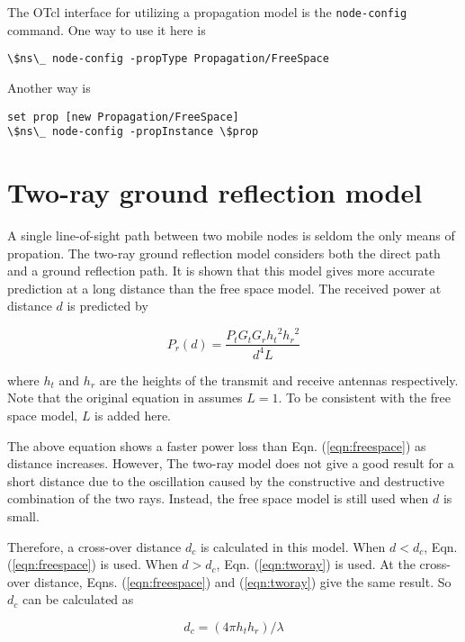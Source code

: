 The OTcl interface for utilizing a propagation model is the {\tt node-config}
command. One way to use it here is

\begin{verbatim}
\$ns\_ node-config -propType Propagation/FreeSpace
\end{verbatim}

Another way is

\begin{verbatim}
set prop [new Propagation/FreeSpace]
\$ns\_ node-config -propInstance \$prop
\end{verbatim}

\section{Two-ray ground reflection model}
\label{sec:tworay}

A single line-of-sight path between two mobile nodes is seldom the only means
of propation. The two-ray ground reflection model considers both the direct
path and a ground reflection path. It is shown \cite{Rappaport96} that this
model gives more accurate prediction at a long distance than the free space
model. The received power at distance $d$ is predicted by

\begin{equation}
  P_r (d) = \frac{P_t G_t G_r {h_t}^2 {h_r}^2}{d^4 L}
  \label{eqn:tworay}
\end{equation}

where $h_t$ and $h_r$ are the heights of the transmit and receive antennas
respectively. Note that the original equation in \cite{Rappaport96} assumes
$L = 1$. To be consistent with the free space model, $L$ is added here.

The above equation shows a faster power loss than Eqn. (\ref{eqn:freespace})
as distance increases. However, The two-ray model does not give a good result
for a short distance due to the oscillation caused by the constructive and
destructive combination of the two rays. Instead, the free space model is
still used when $d$ is small.

Therefore, a cross-over distance $d_c$ is calculated in this model. When
$d < d_c$, Eqn. (\ref{eqn:freespace}) is used. When $d > d_c$, Eqn.
(\ref{eqn:tworay}) is used. At the cross-over distance, Eqns. (\ref{eqn:freespace})
and (\ref{eqn:tworay}) give the same result. So $d_c$ can be calculated as

\begin{equation}
  d_c = \left( 4\pi h_t h_r \right) / \lambda
  \label{eqn:crossover}
\end{equation}

